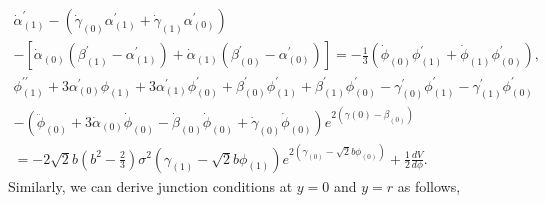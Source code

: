 \documentclass[a4paper,11pt]{article}
\begin{document}
\begin{multline}
\dot{\alpha}_{(1)}^{\prime}
-(\dot{\gamma}_{(0)}\alpha_{(1)}^{\prime}
 +\dot{\gamma}_{(1)}\alpha_{(0)}^{\prime}) \\
-\left[\dot{\alpha}_{(0)}(\beta_{(1)}^{\prime}-\alpha_{(1)}^{\prime})
+\dot{\alpha}_{(1)}(\beta_{(0)}^{\prime}-\alpha_{(0)}^{\prime})\right] 
=-\frac{1}{3}\left(
\dot{\phi}_{(0)}\phi_{(1)}^{\prime}
+\dot{\phi}_{(1)}\phi_{(0)}^{\prime}\right),
\label{eq:1st-order (yt)}
\end{multline}
\begin{multline}
\phi_{(1)}^{\prime\prime}
+3\alpha_{(0)}^{\prime}\phi_{(1)}+3\alpha_{(1)}^{\prime}\phi_{(0)}^{\prime}
+\beta_{(0)}^{\prime}\phi_{(1)}^{\prime}
+\beta_{(1)}^{\prime}\phi_{(0)}^{\prime}
-\gamma_{(0)}^{\prime}\phi_{(1)}^{\prime}
-\gamma_{(1)}^{\prime}\phi_{(0)}^{\prime} \\
-\left(
\ddot{\phi}_{(0)}+3\dot{\alpha}_{(0)}\dot{\phi}_{(0)}
-\dot{\beta}_{(0)}\dot{\phi}_{(0)}
+\dot{\gamma}_{(0)}\dot{\phi}_{(0)} \right) 
e^{2(\gamma{(0)}-\beta_{(0)})}  \\
=-2 \sqrt{2} b\left(b^2-\frac{2}{3}\right) \sigma^2
\left(\gamma_{(1)}-\sqrt{2}b\phi_{(1)}\right)
e^{2(\gamma_{(0)}-\sqrt{2}b\phi_{(0)})} + \frac{1}{2} \frac{d V}{d \phi}.
\label{eq:1st-order phi}
\end{multline}
Similarly, we can derive junction conditions at $y=0$ and $y=r$ 
as follows, 
\end{document}

